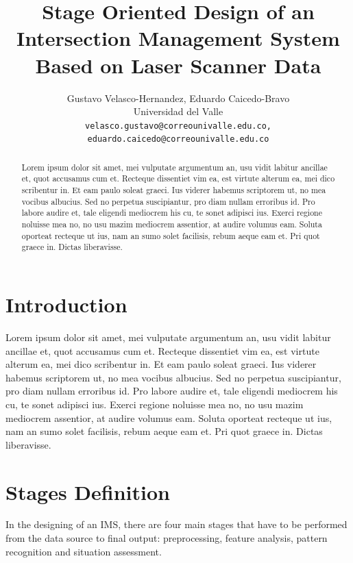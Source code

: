 \documentclass[10pt,twocolumn,letterpaper]{article}
\begin{document}
\title{Stage Oriented Design of an Intersection Management System Based on Laser Scanner Data}

\author{Gustavo Velasco-Hernandez, Eduardo Caicedo-Bravo \\
Universidad del Valle\\
{\tt\small velasco.gustavo@correounivalle.edu.co, eduardo.caicedo@correounivalle.edu.co}
}

\maketitle

\begin{abstract}
Lorem ipsum dolor sit amet, mei vulputate argumentum an, usu vidit labitur ancillae et, quot accusamus cum et. Recteque dissentiet vim ea, est virtute alterum ea, mei dico scribentur in. Et eam paulo soleat graeci. Ius viderer habemus scriptorem ut, no mea vocibus albucius. Sed no perpetua suscipiantur, pro diam nullam erroribus id. Pro labore audire et, tale eligendi mediocrem his cu, te sonet adipisci ius. Exerci regione noluisse mea no, no usu mazim mediocrem assentior, at audire volumus eam. Soluta oporteat recteque ut ius, nam an sumo solet facilisis, rebum aeque eam et. Pri quot graece in. Dictas liberavisse.
\end{abstract}

\section{Introduction}
Lorem ipsum dolor sit amet, mei vulputate argumentum an, usu vidit labitur ancillae et, quot accusamus cum et. Recteque dissentiet vim ea, est virtute alterum ea, mei dico scribentur in. Et eam paulo soleat graeci. Ius viderer habemus scriptorem ut, no mea vocibus albucius. Sed no perpetua suscipiantur, pro diam nullam erroribus id. Pro labore audire et, tale eligendi mediocrem his cu, te sonet adipisci ius. Exerci regione noluisse mea no, no usu mazim mediocrem assentior, at audire volumus eam. Soluta oporteat recteque ut ius, nam an sumo solet facilisis, rebum aeque eam et. Pri quot graece in. Dictas liberavisse.

\section{Stages Definition}
In the designing of an IMS, there are four main stages that have to be performed from the data source to final output: preprocessing, feature analysis, pattern recognition and situation assessment.
\end{document}
